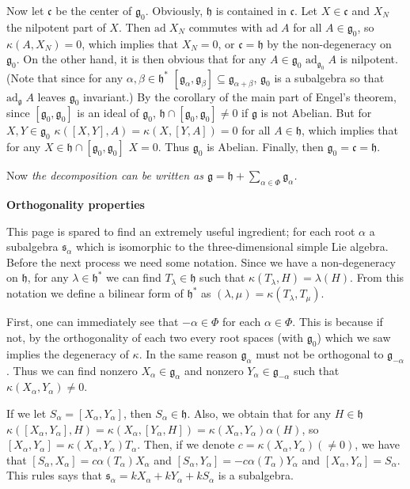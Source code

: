 \documentclass{article}
\newcommand{\lie}[1]{\mathfrak{#1}}
\newcommand{\ad}[1]{\mathrm{ad}\; #1}
\newcommand{\adu}[2]{\mathrm{ad}_{#1}\; #2}
\begin{document}
Now let $\lie{c}$ be the center of $\lie{g}_0$.
Obviously, $\lie{h}$ is contained in $\lie{c}$.
Let $X \in \lie{c}$ and $X_N$ the nilpotent part of $X$.
Then $\ad{X_N}$ commutes with $\ad{A}$ for all $A \in \lie{g}_0$, so $\kappa(A, X_N) = 0$, which implies that $X_N = 0$, or $\lie{c} = \lie{h}$ by the non-degeneracy on $\lie{g}_0$.
On the other hand, it is then obvious that for any $A \in \lie{g}_0$ $\adu{\lie{g}_0}{A}$ is nilpotent.
(Note that since for any $\alpha, \beta \in \lie{h}^*$ $[\lie{g}_\alpha, \lie{g}_\beta] \subseteq \lie{g}_{\alpha + \beta}$, $\lie{g}_0$ is a subalgebra so that $\adu{\lie{g}}{A}$ leaves $\lie{g}_0$ invariant.)
By the corollary of the main part of Engel's theorem, since $[\lie{g}_0, \lie{g}_0]$ is an ideal of $\lie{g}_0$, $\lie{h} \cap [\lie{g}_0, \lie{g}_0] \ne 0$ if $\lie{g}$ is not Abelian.
But for $X, Y \in \lie{g}_0$ $\kappa([X, Y], A) = \kappa(X, [Y, A]) = 0$ for all $A \in \lie{h}$, which implies that for any $X \in \lie{h} \cap [\lie{g}_0, \lie{g}_0]$ $X = 0$.
Thus $\lie{g}_0$ is Abelian.
Finally, then $\lie{g}_0 = \lie{c} = \lie{h}$.

Now \textit{the decomposition can be written as $\lie{g} = \lie{h} + \sum_{\alpha \in \Phi} \lie{g}_\alpha$.}

\newpage

\textbf{Orthogonality properties}

This page is spared to find an extremely useful ingredient; for each root $\alpha$ a subalgebra $\lie{s}_\alpha$ which is isomorphic to the three-dimensional simple Lie algebra.
Before the next process we need some notation.
Since we have a non-degeneracy on $\lie{h}$, for any $\lambda \in \lie{h}^*$ we can find $T_\lambda \in \lie{h}$ such that $\kappa(T_\lambda, H) = \lambda(H)$.
From this notation we define a bilinear form of $\lie{h}^*$ as $(\lambda, \mu) = \kappa(T_\lambda, T_\mu)$.

First, one can immediately see that $-\alpha \in \Phi$ for each $\alpha \in \Phi$.
This is because if not, by the orthogonality of each two every root spaces (with $\lie{g}_0$) which we saw implies the degeneracy of $\kappa$.
In the same reason $\lie{g}_\alpha$ must not be orthogonal to $\lie{g}_{-\alpha}$.
Thus we can find nonzero $X_\alpha \in \lie{g}_\alpha$ and nonzero $Y_\alpha \in \lie{g}_{-\alpha}$ such that $\kappa(X_\alpha, Y_\alpha) \ne 0$.


If we let $S_\alpha = [X_\alpha, Y_\alpha]$, then $S_\alpha \in \lie{h}$. Also, we obtain that for any $H \in \lie{h}$ $\kappa([X_\alpha, Y_\alpha], H) = \kappa(X_\alpha, [Y_\alpha, H]) = \kappa(X_\alpha, Y_\alpha) \alpha(H)$, so $[X_\alpha, Y_\alpha] = \kappa(X_\alpha, Y_\alpha) T_\alpha$.
Then, if we denote $c = \kappa(X_\alpha, Y_\alpha) (\ne 0)$, we have that $[S_\alpha, X_\alpha] = c \alpha(T_\alpha) X_\alpha$ and $[S_\alpha, Y_\alpha] = -c \alpha(T_\alpha) Y_\alpha$ and $[X_\alpha, Y_\alpha] = S_\alpha$.
This rules says that $\lie{s}_\alpha = kX_\alpha + kY_\alpha + kS_\alpha$ is a subalgebra.
\end{document}
